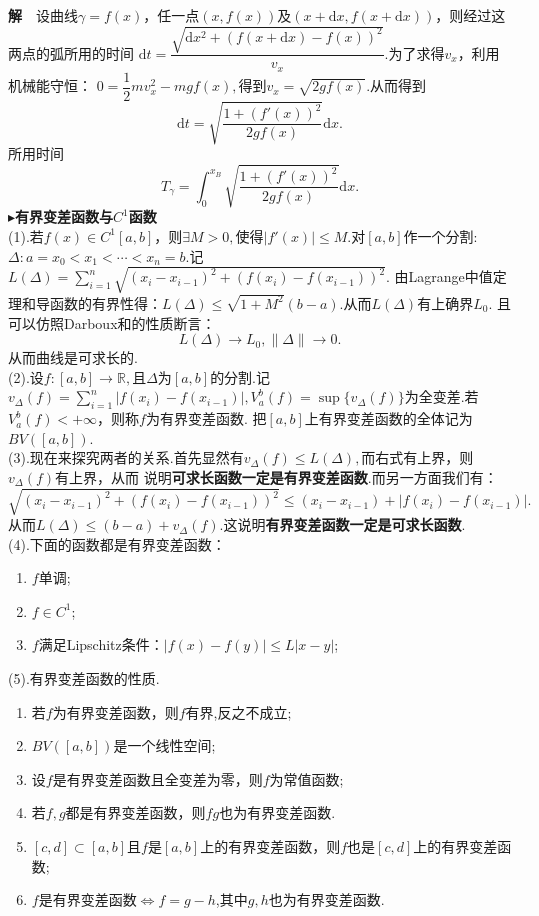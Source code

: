 \documentclass[UTF8]{article}
\newcommand{\dx}{\mathrm{d}x}
\newcommand{\jie}{\textbf{解}$\quad$}
\begin{document}
\jie 设曲线$\gamma=f(x)$，任一点$(x,f(x))$及$(x+\dx,f(x+\dx))$，则经过这两点的弧所用的时间
$\mathrm{d}t=\dfrac{\sqrt{\dx^2+(f(x+\dx)-f(x))^2}}{v_x}.$为了求得$v_x$，利用机械能守恒：
$0=\dfrac{1}{2}mv_x^2-mgf(x),$得到$v_x=\sqrt{2gf(x)}.$从而得到
$$\mathrm{d}t=\sqrt{\frac{1+(f'(x))^2}{2gf(x)}}\dx.$$
所用时间
$$T_\gamma=\int_0^{x_B}\sqrt{\frac{1+(f'(x))^2}{2gf(x)}}\dx.$$
$\blacktriangleright$\textbf{有界变差函数与$C^1$函数}\\
  (1).若$f(x)\in C^1[a,b]$，则$\exists M>0,$使得$|f'(x)|\le M.$对$[a,b]$作一个分割:$\Delta:a=x_0<x_1
  <\cdots<x_n=b$.记$L(\Delta)=\sum\limits_{i=1}^n\sqrt{(x_i-x_{i-1})^2+(f(x_i)-f(x_{i-1}))^2}$.
  由Lagrange中值定理和导函数的有界性得：$L(\Delta)\le\sqrt{1+M^2}(b-a).$从而$L(\Delta)$有上确界$L_0.$
  且可以仿照Darboux和的性质断言：
  $$L(\Delta)\to L_0,\|\Delta\|\to0.$$从而曲线是可求长的.\\
  (2).设$f:[a,b]\rightarrow\mathbb{R},$且$\Delta$为$[a,b]$的分割.记$v_\Delta(f)=\sum\limits_{i=1}^n|
  f(x_i)-f(x_{i-1})|,V_a^b(f)=\sup\{v_\Delta(f)\}$为全变差.若$V_a^b(f)<+\infty$，则称$f$为有界变差函数.
  把$[a,b]$上有界变差函数的全体记为$BV([a,b])$.\\
  (3).现在来探究两者的关系.首先显然有$v_\Delta(f)\le L(\Delta),$而右式有上界，则$v_\Delta(f)$有上界，从而
  说明\textbf{可求长函数一定是有界变差函数}.而另一方面我们有：
  $$\sqrt{(x_i-x_{i-1})^2+(f(x_i)-f(x_{i-1}))^2}\le(x_i-x_{i-1})+|f(x_i)-f(x_{i-1})|.$$
  从而$L(\Delta)\le(b-a)+v_\Delta(f).$这说明\textbf{有界变差函数一定是可求长函数}.\\
  (4).下面的函数都是有界变差函数：
  \begin{enumerate}
    \item $f$单调;
    \item $f\in C^1$;
    \item $f$满足Lipschitz条件：$|f(x)-f(y)|\le L|x-y|$;
  \end{enumerate}
  (5).有界变差函数的性质.
  \begin{enumerate}
    \item 若$f$为有界变差函数，则$f$有界,反之不成立;
    \item $BV([a,b])$是一个线性空间;
    \item 设$f$是有界变差函数且全变差为零，则$f$为常值函数;
    \item 若$f,g$都是有界变差函数，则$fg$也为有界变差函数.
    \item $[c,d]\subset[a,b]$且$f$是$[a,b]$上的有界变差函数，则$f$也是$[c,d]$上的有界变差函数;
    \item $f$是有界变差函数$\Longleftrightarrow f=g-h$,其中$g,h$也为有界变差函数.
  \end{enumerate}
  \clearpage
\end{document}
